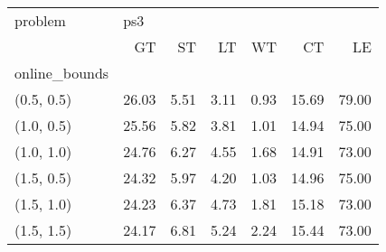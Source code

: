 \begin{tabular}{lrrrrrr}
\toprule
problem & \multicolumn{6}{l}{ps3} \\
{} &    GT &   ST &   LT &   WT &    CT &    LE \\
online\_bounds &       &      &      &      &       &       \\
\midrule
(0.5, 0.5)    & 26.03 & 5.51 & 3.11 & 0.93 & 15.69 & 79.00 \\
(1.0, 0.5)    & 25.56 & 5.82 & 3.81 & 1.01 & 14.94 & 75.00 \\
(1.0, 1.0)    & 24.76 & 6.27 & 4.55 & 1.68 & 14.91 & 73.00 \\
(1.5, 0.5)    & 24.32 & 5.97 & 4.20 & 1.03 & 14.96 & 75.00 \\
(1.5, 1.0)    & 24.23 & 6.37 & 4.73 & 1.81 & 15.18 & 73.00 \\
(1.5, 1.5)    & 24.17 & 6.81 & 5.24 & 2.24 & 15.44 & 73.00 \\
\bottomrule
\end{tabular}
